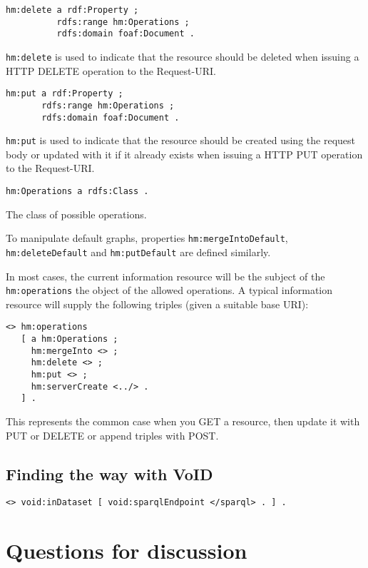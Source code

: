 \documentclass{llncs}
\begin{document}
\begin{verbatim}
hm:delete a rdf:Property ;
          rdfs:range hm:Operations ;
          rdfs:domain foaf:Document .
\end{verbatim}
\texttt{hm:delete} is used to indicate that the resource should be
deleted when issuing a HTTP DELETE operation to the Request-URI. 

\begin{verbatim}
hm:put a rdf:Property ;
       rdfs:range hm:Operations ;
       rdfs:domain foaf:Document .
\end{verbatim}
\texttt{hm:put} is used to indicate that the resource should be
created using the request body or updated with it if it already exists
when issuing a HTTP PUT operation to the Request-URI.

\begin{verbatim}
hm:Operations a rdfs:Class .
\end{verbatim}
The class of possible operations.

To manipulate default graphs, properties \texttt{hm:mergeIntoDefault},
\texttt{hm:deleteDefault} and \texttt{hm:putDefault} are defined
similarly.

In most cases, the current information resource will be the subject of
the \texttt{hm:operations}  the object of the allowed
operations. A typical information resource will supply the following
triples (given a suitable base URI):

\begin{verbatim}
<> hm:operations
   [ a hm:Operations ;
     hm:mergeInto <> ;
     hm:delete <> ;
     hm:put <> ;
     hm:serverCreate <../> .
   ] .
\end{verbatim}
This represents the common case when you GET a resource, then update
it with PUT or DELETE or append triples with POST.


\subsection{Finding the way with VoID}

\begin{verbatim}
<> void:inDataset [ void:sparqlEndpoint </sparql> . ] .
\end{verbatim}

\section{Questions for discussion}
\end{document}
